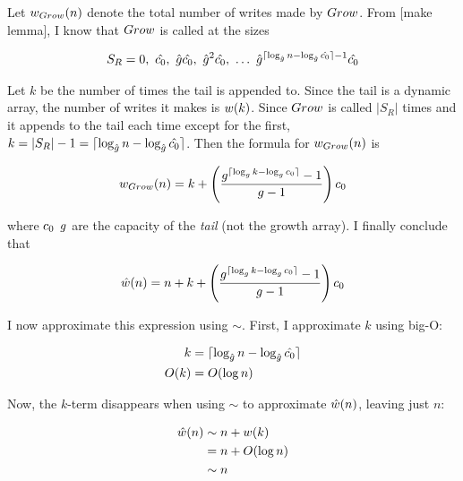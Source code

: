 Let ${w}_{Grow}(n)$ denote the total number of writes made by $Grow$. From [make lemma], I know that $Grow$ is called at the sizes

\begin{align*}
S_R = 0,\ \VarInitCapacityNew,\ \VarGrowthFactorNew\VarInitCapacityNew,\ \VarGrowthFactorNew^2\VarInitCapacityNew,\ \ldots\ \VarGrowthFactorNew^{\lceil \log_{\VarGrowthFactorNew} n - \log_{\VarGrowthFactorNew} \VarInitCapacityNew \rceil - 1}\VarInitCapacityNew
\end{align*}

Let $k$ be the number of times the tail is appended to. Since the tail is a dynamic array, the number of writes it makes is $w(k)$. Since $Grow$ is called $|S_R|$ times and it appends to the tail each time except for the first, $k = |S_R| - 1 = \lceil \log_{\hat{g}} n - \log_{\hat{g}} \hat{c_0} \rceil$. Then the formula for ${w}_{Grow}(n)$ is

\begin{align*}
{w}_{Grow}(n) = k + \left( \frac{g^{\lceil \log_{g} k - \log_{g} c_0 \rceil} - 1}{g - 1} \right) c_0
\end{align*}

where $c_0$ $g$ are the capacity of the \textit{tail} (not the growth array). I finally conclude that

\begin{align*}
\hat{w}(n) = n + k + \left( \frac{g^{\lceil \log_{g} k - \log_{g} c_0 \rceil} - 1}{g - 1} \right) c_0
\end{align*}

I now approximate this expression using $\sim$. First, I approximate $k$ using big-O:

\begin{align*}
k &= \lceil \log_{\hat{g}} n - \log_{\hat{g}} \hat{c_0} \rceil\\
O(k) &= O(\log n)
\end{align*}

Now, the $k$-term disappears when using $\sim$ to approximate $\hat{w}(n)$, leaving just $n$:

\begin{align*}
\hat{w}(n) &\sim n + w(k)\\
&= n + O(\log n)\\
&\sim n
\end{align*}

